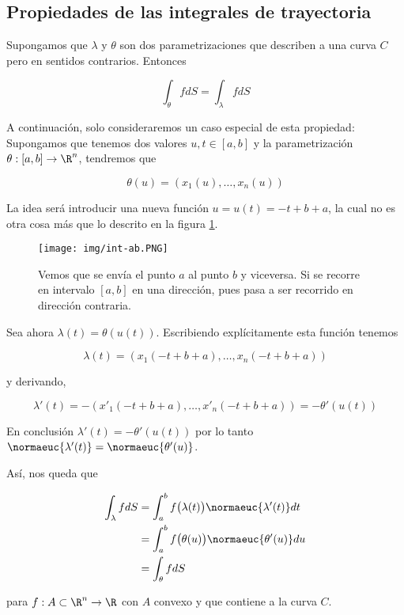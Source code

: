 \subsection{Propiedades de las integrales de trayectoria}

Supongamos que $\lambda$ y $\theta$ son dos parametrizaciones que describen a una curva $C$ pero en sentidos contrarios. Entonces

\[
\int_{\theta} fdS = \int_{\lambda} fdS
\]

A continuación, solo consideraremos un caso especial de esta propiedad: Supongamos que tenemos dos valores $u, t \in [a,b]$ y la parametrización $\theta: [a,b] \rightarrow \R^n$, tendremos que

\[
\theta(u) = \left( x_1(u), \dots, x_n(u) \right)
\]

La idea será introducir una nueva función $u = u(t) = -t + b + a$, la cual no es otra cosa más que lo descrito en la figura \ref{fig:int-ab}.

\begin{figure}
    \centering
    \texttt{[image: img/int-ab.PNG]}
    \caption{Vemos que se envía el punto $a$ al punto $b$ y viceversa. Si se recorre en intervalo $[a,b]$ en una dirección, pues pasa a ser recorrido en dirección contraria.}
    \label{fig:int-ab}
\end{figure}

Sea ahora $\lambda(t) = \theta\left( u(t) \right)$. Escribiendo explícitamente esta función tenemos

\[
\lambda(t) = \left( x_1(-t+b+a), \dots, x_n(-t+b+a) \right)
\]

\noindent y derivando,

\[
\lambda'(t) = -\left( x'_1(-t+b+a), \dots, x'_n(-t+b+a) \right) = -\theta'\left( u(t) \right)
\]

En conclusión $\lambda'(t) = -\theta'\left( u(t) \right)$ por lo tanto $\normaeuc{\lambda'(t)} = \normaeuc{\theta'(u)}$.

Así, nos queda que

\begin{align*}
    \int_{\lambda} fdS &= \int_a^b f\big( \lambda(t) \big)\normaeuc{\lambda'(t)} dt \\
        &= \int_a^b f\big(\theta(u)\big) \normaeuc{\theta'(u)}du \\
        &= \int_{\theta} fdS
\end{align*}

\noindent para $f: A \subset \R^n \rightarrow \R$ con $A$ convexo y que contiene a la curva $C$.

